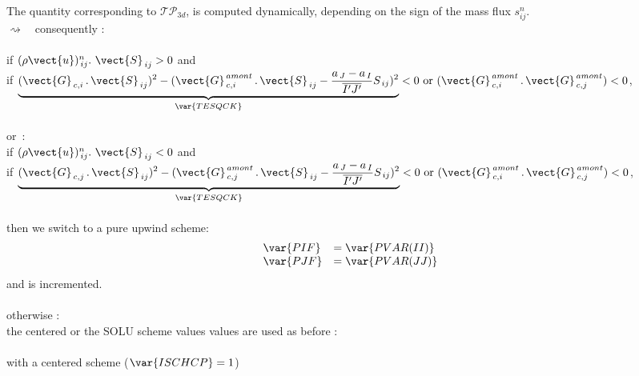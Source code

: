 The quantity  corresponding to $\mathcal{TP}_{3d}$, is
computed dynamically, depending on the sign of the mass flux  $s^n_{ij}$.\\
\hspace*{2.5cm}$\rightsquigarrow$\ \ consequently  :\\\\
\hspace*{1.5cm}{\tiny$\diamond$} if $(\rho \vect{u})_{\,ij}^n.\ \vect{S}_{\,ij} > 0$ and \\
\hspace*{2cm} if $\underbrace{(\vect{G}_{\,c,i}\,.\, \vect{S}_{\,ij})^2 - (\vect{G}^{\,amont}_{\,c,i}\,.\,\vect{S}_{\,ij} - \displaystyle\frac{a_{\,J}-
a_{\,I}}{\overline{I'J'}} S_{\,ij})^2}_{\var{TESQCK}}  < 0 \text{ or } (\vect{G}^{\,amont}_{\,c,i}\,.\,\vect{G}^{\,amont}_{\,c,j}) < 0$,\\\\
\hspace*{1.5cm} or~:\\
\hspace*{1.5cm} if $(\rho \vect{u})_{\,ij}^n.\ \vect{S}_{\,ij} < 0$  and \\
\hspace*{2cm} if $\underbrace{(\vect{G}_{\,c,j}\,.\, \vect{S}_{\,ij})^2 -
(\vect{G}^{\,amont}_{\,c,j}\,.\,\vect{S}_{\,ij} - \displaystyle\frac{a_{\,J}-
a_{\,I}}{\overline{I'J'}} S_{\,ij})^2}_{\var{TESQCK}} < 0 \text{ or }
(\vect{G}^{\,amont}_{\,c,i}\,.\,\vect{G}^{\,amont}_{\,c,j}) < 0$,\\\\
\hspace*{1.5cm}then we switch to a pure upwind scheme:
\begin{equation}
\begin{array}{ll}
\var{PIF} &= \var{PVAR(II)} \\
\var{PJF} &= \var{PVAR(JJ)} \\
\end{array}
\end{equation}
\hspace*{1.5cm} and  is incremented.\\\\
\hspace*{1.5cm}{\tiny$\diamond$} otherwise :\\
\hspace*{1.5cm} the centered or the SOLU scheme values values are used as before :\\\\
\hspace*{2.5cm}{\tiny$\bigstar$} with a centered scheme ($\var{ISCHCP} = 1$)\\
